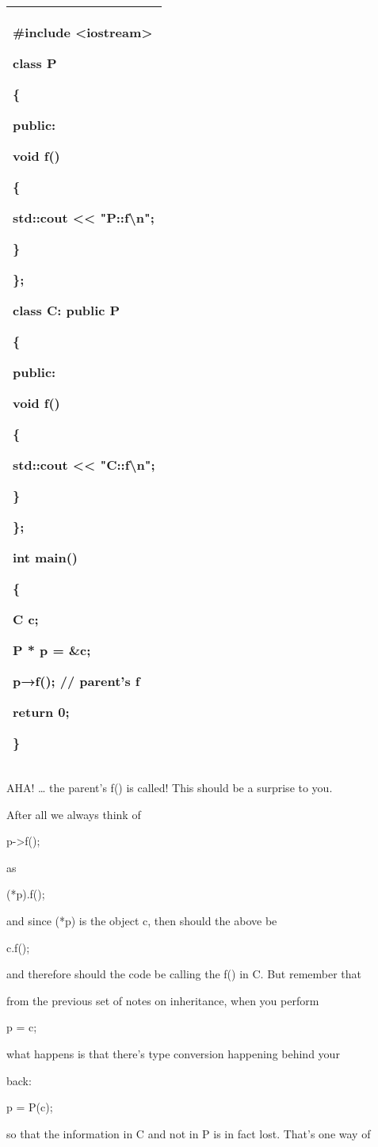 \documentclass[
]{article}
\begin{document}
\begin{longtable}[]{@{}l@{}}
\toprule
\endhead
\begin{minipage}[t]{0.97\columnwidth}\raggedright
\#include \textless iostream\textgreater{}

class P

\{

public:

void f()

\{

std::cout \textless\textless{} "P::f\textbackslash n";

\}

\};

class C: public P

\{

public:

void f()

\{

std::cout \textless\textless{} "C::f\textbackslash n";

\}

\};

int main()

\{

C c;

P * p = \&c;

p→f(); // parent's f

return 0;

\}\strut
\end{minipage}\tabularnewline
\bottomrule
\end{longtable}

AHA! \ldots{} the parent's f() is called! This should be a surprise to
you.

After all we always think of

p-\textgreater f();

as

(*p).f();

and since (*p) is the object c, then should the above be

c.f();

and therefore should the code be calling the f() in C. But remember that

from the previous set of notes on inheritance, when you perform

p = c;

what happens is that there's type conversion happening behind your

back:

p = P(c);

so that the information in C and not in P is in fact lost. That's one
way of
\end{document}

